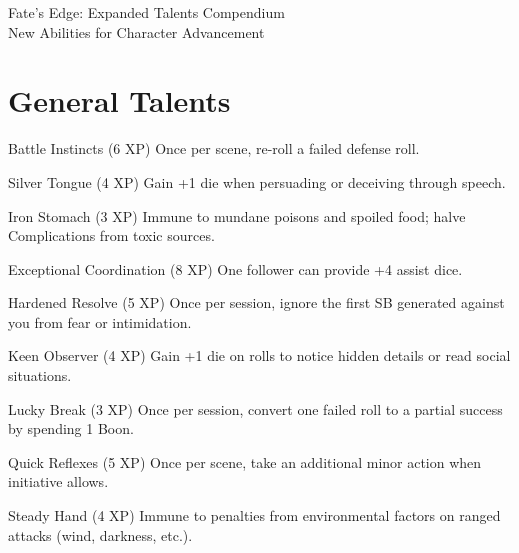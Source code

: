 \documentclass[11pt]{article}
\begin{document}
\begin{center}
{\Huge Fate's Edge: Expanded Talents Compendium}\\
\vspace{0.5cm}
{\large New Abilities for Character Advancement}
\end{center}

\section*{General Talents}

\begin{talentbox}{Battle Instincts (6 XP)}
Once per scene, re-roll a failed defense roll.
\end{talentbox}

\begin{talentbox}{Silver Tongue (4 XP)}
Gain +1 die when persuading or deceiving through speech.
\end{talentbox}

\begin{talentbox}{Iron Stomach (3 XP)}
Immune to mundane poisons and spoiled food; halve Complications from toxic sources.
\end{talentbox}

\begin{talentbox}{Exceptional Coordination (8 XP)}
One follower can provide +4 assist dice.
\end{talentbox}

\begin{talentbox}{Hardened Resolve (5 XP)}
Once per session, ignore the first SB generated against you from fear or intimidation.
\end{talentbox}

\begin{talentbox}{Keen Observer (4 XP)}
Gain +1 die on rolls to notice hidden details or read social situations.
\end{talentbox}

\begin{talentbox}{Lucky Break (3 XP)}
Once per session, convert one failed roll to a partial success by spending 1 Boon.
\end{talentbox}

\begin{talentbox}{Quick Reflexes (5 XP)}
Once per scene, take an additional minor action when initiative allows.
\end{talentbox}

\begin{talentbox}{Steady Hand (4 XP)}
Immune to penalties from environmental factors on ranged attacks (wind, darkness, etc.).
\end{talentbox}
\end{document}
